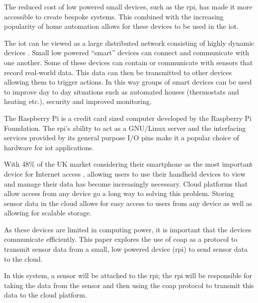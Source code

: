 The reduced cost of low powered small devices, such as the \gls{rpi}, has made it 
more accessible to create bespoke systems. 
This combined with the increasing popularity of home automation allows for these 
devices to be used in the \gls{iot}.

The \gls{iot} can be viewed as a large distributed network consisting of highly 
dynamic devices \citep{miorandi_internet_2012}. Small low powered ``smart'' devices 
can connect and communicate with one another. Some of these devices can contain or 
communicate with sensors that record real-world data. This data can then be 
transmitted to other devices allowing them to trigger actions. In this way groups 
of smart devices can be used to improve day to day situations such as automated 
houses (thermostats and heating etc.), security and improved monitoring.

The Raspberry Pi \citep{pi_model_2018} is a credit card sized 
computer developed by the Raspberry Pi Foundation. 
The \gls{rpi}'s ability to act as a GNU/Linux server and the interfacing services 
provided by its general purpose I/O pins make it a popular 
choice of hardware for \gls{iot} applications. \citep{kumar_iot_2016}

With 48\% of the UK market considering their smartphone as the most important 
device for Internet access \citep{ofcom_communications_2018}, allowing users to use 
their handheld devices to view and manage their data has become increasingly 
necessary. Cloud platforms that allow access from any device go a long way to 
solving this problem. Storing sensor data in the cloud allows for easy access to 
users from any device as well as allowing for scalable storage.

As these devices are limited in computing power, it is important that the devices 
communicate efficiently. 
This paper explores the use of \gls{coap} as a protocol to transmit sensor data 
from a small, low powered device (\gls{rpi}) to send sensor data to the cloud.

In this system, a sensor will be attached to the \gls{rpi}; the \gls{rpi} will 
be responsible for taking the data from the sensor and then 
using the \gls{coap} protocol to transmit this data to the cloud platform.